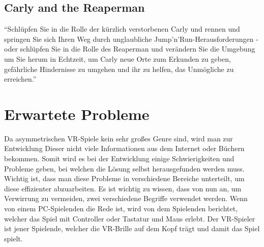\subsection{Carly and the Reaperman}
"`Schlüpfen Sie in die Rolle der kürzlich verstorbenen Carly und rennen und springen Sie sich Ihren Weg durch unglaubliche Jump'n'Run-Herausforderungen - oder schlüpfen Sie in die Rolle des Reaperman und verändern Sie die Umgebung um Sie herum in Echtzeit, um Carly neue Orte zum Erkunden zu geben, gefährliche Hindernisse zu umgehen und ihr zu helfen, das Unmögliche zu erreichen."'
\cite{_steam_carly}

\section{Erwartete Probleme}
Da asymmetrischen VR-Spiele kein sehr großes Genre sind, wird man zur Entwicklung Dieser nicht viele Informationen aus dem Internet oder Büchern bekommen. Somit wird es bei der Entwicklung einige Schwierigkeiten und Probleme geben, bei welchen die Lösung selbst herausgefunden werden muss. Wichtig ist, dass man diese Probleme in verschiedene Bereiche unterteilt, um diese effizienter abzuarbeiten. Es ist wichtig zu wissen, dass von nun an, um Verwirrung zu vermeiden, zwei verschiedene Begriffe verwendet werden. Wenn von einem PC-Spielenden die Rede ist, wird von dem Spielenden berichtet, welcher das Spiel mit Controller oder Tastatur und Maus erlebt. Der VR-Spieler ist jener Spielende, welcher die VR-Brille auf dem Kopf trägt und damit das Spiel spielt. 

